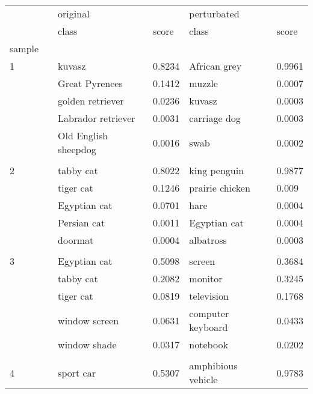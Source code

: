 \begin{tabular}{llllll}
\toprule
  & {} &              original &         &          perturbated &         \\
  & {} &                 class &   score &                class &   score \\
sample & {} &                       &         &                      &         \\
\midrule
1 & {} &                kuvasz &  0.8234 &         African grey &  0.9961 \\
  & {} &        Great Pyrenees &  0.1412 &               muzzle &  0.0007 \\
  & {} &      golden retriever &  0.0236 &               kuvasz &  0.0003 \\
  & {} &    Labrador retriever &  0.0031 &         carriage dog &  0.0003 \\
  & {} &  Old English sheepdog &  0.0016 &                 swab &  0.0002 \\
  & {} &                       &         &                      &         \\
2 & {} &             tabby cat &  0.8022 &         king penguin &  0.9877 \\
  & {} &             tiger cat &  0.1246 &      prairie chicken &   0.009 \\
  & {} &          Egyptian cat &  0.0701 &                 hare &  0.0004 \\
  & {} &           Persian cat &  0.0011 &         Egyptian cat &  0.0004 \\
  & {} &               doormat &  0.0004 &            albatross &  0.0003 \\
  & {} &                       &         &                      &         \\
3 & {} &          Egyptian cat &  0.5098 &               screen &  0.3684 \\
  & {} &             tabby cat &  0.2082 &              monitor &  0.3245 \\
  & {} &             tiger cat &  0.0819 &           television &  0.1768 \\
  & {} &         window screen &  0.0631 &    computer keyboard &  0.0433 \\
  & {} &          window shade &  0.0317 &             notebook &  0.0202 \\
  & {} &                       &         &                      &         \\
4 & {} &             sport car &  0.5307 &   amphibious vehicle &  0.9783 \\

\end{tabular}
